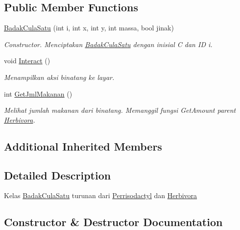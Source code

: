 \subsection*{Public Member Functions}
\begin{DoxyCompactItemize}
\item 
\hyperlink{classBadakCulaSatu_acb72f5690f5c5a73e75a76b1cf40dcdc}{Badak\+Cula\+Satu} (int i, int x, int y, int massa, bool jinak)
\begin{DoxyCompactList}\small\item\em Constructor. Menciptakan \hyperlink{classBadakCulaSatu}{Badak\+Cula\+Satu} dengan inisial \textquotesingle{}C\textquotesingle{} dan ID i. \end{DoxyCompactList}\item 
void \hyperlink{classBadakCulaSatu_acf58879822c89caa0d2d873fae9d6538}{Interact} ()\hypertarget{classBadakCulaSatu_acf58879822c89caa0d2d873fae9d6538}{}\label{classBadakCulaSatu_acf58879822c89caa0d2d873fae9d6538}

\begin{DoxyCompactList}\small\item\em Menampilkan aksi binatang ke layar. \end{DoxyCompactList}\item 
int \hyperlink{classBadakCulaSatu_a1b53ef7e5a7fbcb46c9daffc3be05bfb}{Get\+Jml\+Makanan} ()
\begin{DoxyCompactList}\small\item\em Melihat jumlah makanan dari binatang. Memanggil fungsi Get\+Amount parent \hyperlink{classHerbivora}{Herbivora}. \end{DoxyCompactList}\end{DoxyCompactItemize}
\subsection*{Additional Inherited Members}


\subsection{Detailed Description}
Kelas \hyperlink{classBadakCulaSatu}{Badak\+Cula\+Satu} turunan dari \hyperlink{classPerrisodactyl}{Perrisodactyl} dan \hyperlink{classHerbivora}{Herbivora} 

\subsection{Constructor \& Destructor Documentation}
